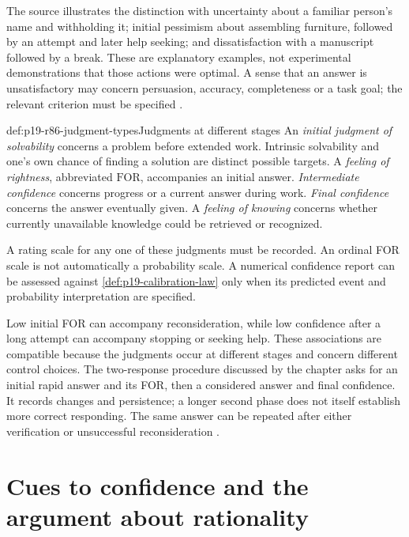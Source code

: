 The source illustrates the distinction with uncertainty about a familiar
person's name and withholding it; initial pessimism about assembling furniture,
followed by an attempt and later help seeking; and dissatisfaction with a
manuscript followed by a break. These are explanatory examples, not experimental
demonstrations that those actions were optimal. A sense that an answer is
unsatisfactory may concern persuasion, accuracy, completeness or a task goal;
the relevant criterion must be specified
\cite[pp.~517--518]{ThompsonElqayamAckerman2021MetaReasoning}.

\begin{hbdefinition}{def:p19-r86-judgment-types}{Judgments at different stages}
An \emph{initial judgment of solvability} concerns a problem before extended
work. Intrinsic solvability and one's own chance of finding a solution are
distinct possible targets. A \emph{feeling of rightness}, abbreviated \(\mathrm{FOR}\),
accompanies an initial answer. \emph{Intermediate confidence} concerns progress
or a current answer during work. \emph{Final confidence} concerns the answer
eventually given. A \emph{feeling of knowing} concerns whether currently
unavailable knowledge could be retrieved or recognized.

A rating scale for any one of these judgments must be recorded. An ordinal
FOR scale is not automatically a probability scale. A numerical confidence
report can be assessed against \ref{def:p19-calibration-law} only when its
predicted event and probability interpretation are specified.
\end{hbdefinition}

Low initial FOR can accompany reconsideration, while low confidence after a
long attempt can accompany stopping or seeking help. These associations are
compatible because the judgments occur at different stages and concern
different control choices. The two-response procedure discussed by the chapter
asks for an initial rapid answer and its FOR, then a considered answer and
final confidence. It records changes and persistence; a longer second phase
does not itself establish more correct responding. The same answer can be
repeated after either verification or unsuccessful reconsideration
\cite[pp.~518, 522]{ThompsonElqayamAckerman2021MetaReasoning}.

\section{Cues to confidence and the argument about rationality}
\label{sec:p19-r86-cues}

